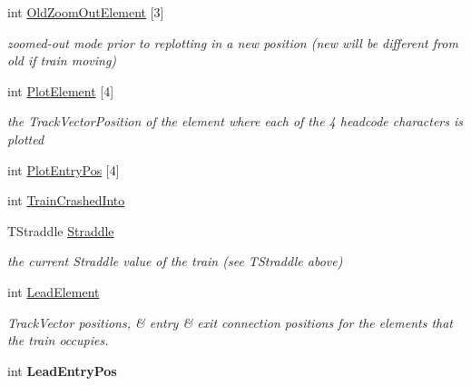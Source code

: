 \begin{DoxyCompactItemize}
int \mbox{\hyperlink{class_t_train_a29c7350be73eb11a6c018a4bc8f8099a}{Old\+Zoom\+Out\+Element}} \mbox{[}3\mbox{]}
\begin{DoxyCompactList}\small\item\em zoomed-\/out mode prior to replotting in a new position (new will be different from old if train moving) \end{DoxyCompactList}\item 
\mbox{\label{class_t_train_ac711fc0e209da47a98fd40def880f119}} 
int \mbox{\hyperlink{class_t_train_ac711fc0e209da47a98fd40def880f119}{Plot\+Element}} \mbox{[}4\mbox{]}
\begin{DoxyCompactList}\small\item\em the Track\+Vector\+Position of the element where each of the 4 headcode characters is plotted \end{DoxyCompactList}\item 
int \mbox{\hyperlink{class_t_train_ac4ff3ae93a80d230d1ddcb992b0b546a}{Plot\+Entry\+Pos}} \mbox{[}4\mbox{]}
\item 
int \mbox{\hyperlink{class_t_train_ad7644b30da32d0d9e6541ba7629a4a35}{Train\+Crashed\+Into}}
\item 
\mbox{\label{class_t_train_aba7fc74449b392035805ecc4f2bc1650}} 
T\+Straddle \mbox{\hyperlink{class_t_train_aba7fc74449b392035805ecc4f2bc1650}{Straddle}}
\begin{DoxyCompactList}\small\item\em the current Straddle value of the train (see T\+Straddle above) \end{DoxyCompactList}\item 
\mbox{\label{class_t_train_abba9596f03b731ba4055f4d3591f5b0e}} 
int \mbox{\hyperlink{class_t_train_abba9596f03b731ba4055f4d3591f5b0e}{Lead\+Element}}
\begin{DoxyCompactList}\small\item\em Track\+Vector positions, \& entry \& exit connection positions for the elements that the train occupies. \end{DoxyCompactList}\item 
\mbox{\label{class_t_train_ae5acbf95c32fbf654e4f68417032edad}} 
int {\bfseries Lead\+Entry\+Pos}
\item 
\mbox{\label{class_t_train_af92045cb9d4cb0fa368d1541e4fb2780}} 

\end{DoxyCompactItemize}
